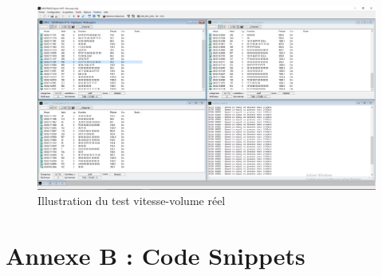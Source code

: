 \documentclass{rapportECC}
\begin{document}
\begin{figure}[H]
    \centering
    \includegraphics[width=.9\textwidth]{./images/Real_Limit_vitesse.png}
    \caption{Illustration du test vitesse-volume réel}
    \label{fig:real_limit_vitesse}
\end{figure}

\pagebreak

\section{Annexe B : Code Snippets}\label{sec:annexeB}




\end{document}
